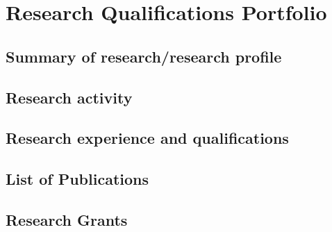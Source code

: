 \chapter{Research Qualifications Portfolio}

\section{Summary of research/research profile} \label{sec:summary-of-research-research-profile}

\section{Research activity} \label{sec:research-activity}

\section{Research experience and qualifications} \label{sec:research-experience-and-qualifications}

\section{List of Publications} \label{sec:list-of-publications}

\section{Research Grants} \label{sec:research-grants}
